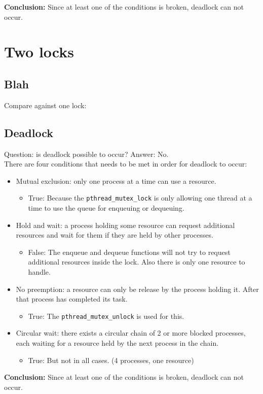 \documentclass[a4paper,11pt,twoside,fleqn]{article}
\begin{document}
\textbf{Conclusion:} Since at least one of the conditions is broken, deadlock can not occur.
\clearpage


\section{Two locks}


\subsection*{Blah}

Compare against one lock:

\subsection*{\textbf{Deadlock}}

Question: is deadlock possible to occur? Answer: No.
\\
There are four conditions that needs to be met in order for deadlock to occur:
\begin{itemize}

\item
Mutual exclusion: only one process at a time can use a resource.
\begin{itemize} \item True: Because the \verb+pthread_mutex_lock+ is only allowing one thread at a time to use the queue for enqueuing or dequeuing.
\end{itemize}

\item Hold and wait: a process holding some resource can request additional resources and wait for them if they are held by other processes.
\begin{itemize}
\item False: The enqueue and dequeue functions will not try to request additional resources inside the lock. Also there is only one resource to handle.
\end{itemize}

\item No preemption: a resource can only be release by the process holding it. After that process has completed its task.
\begin{itemize}
\item True: The \verb+pthread_mutex_unlock+ is used for this.
\end{itemize} 

\item Circular wait: there exists a circular chain of 2 or more blocked processes, each waiting for a resource held by the next process in the chain.

\begin{itemize}
\item True: But not in all cases. (4 processes, one resource) 
\end{itemize} 
\end{itemize}

\textbf{Conclusion:} Since at least one of the conditions is broken, deadlock can not occur.

\end{document}
